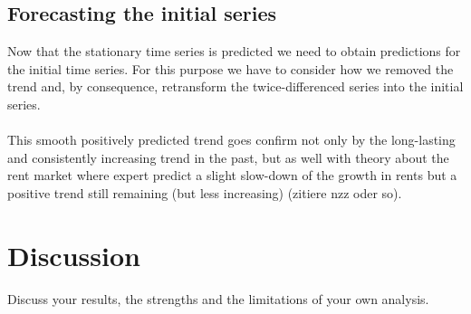 \documentclass[11pt,a4paper]{article}
\begin{document}
\subsection{Forecasting the initial series}
Now that the stationary time series is predicted we need to obtain predictions for the initial time series. For this purpose we have to consider how we removed the trend and, by consequence, retransform the twice-differenced series into the initial series. 
\\
\\
This smooth positively predicted trend goes confirm not only by the long-lasting and consistently increasing trend in the past, but as well with theory about the rent market where expert predict a slight slow-down of the growth in rents but a positive trend still remaining (but less increasing) (zitiere nzz oder so).



\section{Discussion}
Discuss your results, the strengths and the limitations of your own analysis. 
\end{document}

